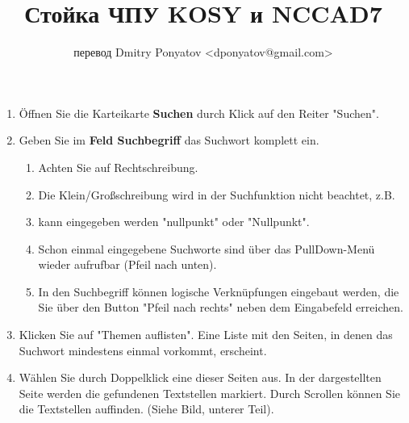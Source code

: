 

\title{Стойка ЧПУ KOSY и NCCAD7}
\author{перевод Dmitry Ponyatov <dponyatov@gmail.com>}



\maketitle


\tableofcontents




\bigskip 

\begin{enumerate}
  \item Öffnen Sie die Karteikarte \textbf{Suchen} durch Klick auf den Reiter
  "Suchen".
  \item Geben Sie im \textbf{Feld Suchbegriff} das Suchwort komplett ein. 
\begin{enumerate}
  \item Achten Sie auf Rechtschreibung. 
  \item Die Klein/Großschreibung wird in der Suchfunktion nicht beachtet, z.B.
  \item kann eingegeben werden "nullpunkt" oder "Nullpunkt".
  \item Schon einmal eingegebene Suchworte sind über das PullDown-Menü wieder
  aufrufbar (Pfeil nach unten).
  \item In den Suchbegriff können logische Verknüpfungen eingebaut werden, die
Sie über den Button "Pfeil nach rechts" neben dem Eingabefeld erreichen.
\end{enumerate}
  \item Klicken Sie auf "Themen auflisten". Eine Liste mit den Seiten, in denen
das Suchwort mindestens einmal vorkommt, erscheint.
  \item Wählen Sie durch Doppelklick eine dieser Seiten aus. In der
dargestellten Seite werden die gefundenen Textstellen markiert. Durch Scrollen können
 Sie die Textstellen auffinden. (Siehe Bild, unterer Teil).
\end{enumerate}

